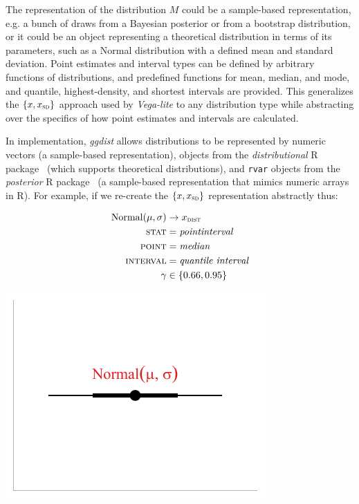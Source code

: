 \documentclass[journal]{vgtc}              %
\begin{document}
The representation of the distribution $M$ could be a sample-based representation, e.g. a bunch of draws from a Bayesian posterior or from a bootstrap distribution, or it could be an object representing a theoretical distribution in terms of its parameters, such as a Normal distribution with a defined mean and standard deviation. Point estimates and interval types can be defined by arbitrary functions of distributions, and predefined functions for mean, median, and mode, and quantile, highest-density, and shortest intervals are provided. This generalizes the $\{x, x_\textsc{sd}\}$ approach used by \textit{Vega-lite} to any distribution type while abstracting over the specifics of how point estimates and intervals are calculated.

In implementation, \textit{ggdist} allows distributions to be represented by numeric vectors (a sample-based representation), objects from the \textit{distributional } R package~\cite{oharawild2022distributional} (which supports theoretical distributions), and \texttt{rvar} objects from the \textit{posterior} R package~\cite{burkner2022posterior} (a sample-based representation that mimics numeric arrays in R). For example, if we re-create the $\{x, x_\textsc{sd}\}$ representation abstractly thus:

\noindent
\begin{minipage}{.5\columnwidth}

\begin{align*}
\operatorname{Normal}(\mu, \sigma) &\rightarrow x_\textsc{dist}\\
\textsc{stat} &= \mathit{pointinterval}\\
\textsc{point} &= \mathit{median}\\
\textsc{interval} &= \textit{quantile interval}\\
\gamma &\in \{0.66, 0.95\}
\end{align*}
\end{minipage}%
  \begin{minipage}{.4\columnwidth}
    \centering
    \includegraphics[width=1.2\columnwidth]{figs/3-stat_pointinterval_normal.pdf}
  \end{minipage}
\hfill\break
\end{document}
